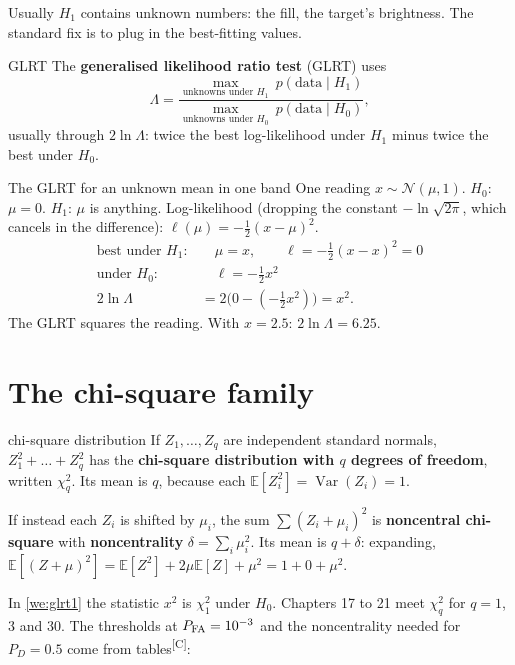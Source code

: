 \documentclass[11pt,a4paper,oneside,openany]{book}
\newcommand{\comp}{\textsuperscript{\textsf{\scriptsize[C]}}}
\newcommand{\E}{\mathbb{E}}
\newcommand{\Var}{\operatorname{Var}}
\begin{document}
Usually $H_1$ contains unknown numbers: the fill, the target's brightness. The standard fix is to plug in the best-fitting values.

\begin{defn}{GLRT}
The \textbf{generalised likelihood ratio test} (GLRT) uses
\[
  \Lambda=\frac{\max_{\text{unknowns under }H_1}\ p(\text{data}\mid H_1)}{\max_{\text{unknowns under }H_0}\ p(\text{data}\mid H_0)},
\]
usually through $2\ln\Lambda$: twice the best log-likelihood under $H_1$ minus twice the best under $H_0$.
\end{defn}

\begin{worked}[label=we:glrt1]{The GLRT for an unknown mean in one band}
One reading $x\sim\mathcal N(\mu,1)$. $H_0$: $\mu=0$. $H_1$: $\mu$ is anything. Log-likelihood (dropping the constant
$-\ln\sqrt{2\pi}$, which cancels in the difference): $\ell(\mu)=-\frac12(x-\mu)^2$.
\begin{align*}
\text{best under }H_1: &\quad \mu=x,\qquad \ell=-\tfrac12(x-x)^2=0\\
\text{under }H_0: &\quad \ell=-\tfrac12x^2\\
2\ln\Lambda &= 2\big(0-(-\tfrac12x^2)\big)=x^2 .
\end{align*}
The GLRT squares the reading. With $x=2.5$: $2\ln\Lambda=6.25$.
\end{worked}

\section{The chi-square family}

\begin{defn}{chi-square distribution}
If $Z_1,\dots,Z_q$ are independent standard normals, $Z_1^2+\dots+Z_q^2$ has the \textbf{chi-square distribution with $q$
degrees of freedom}, written $\chi^2_q$. Its mean is $q$, because each $\E[Z_i^2]=\Var(Z_i)=1$.

If instead each $Z_i$ is shifted by $\mu_i$, the sum $\sum(Z_i+\mu_i)^2$ is \textbf{noncentral chi-square} with
\textbf{noncentrality} $\delta=\sum_i\mu_i^2$. Its mean is $q+\delta$: expanding, $\E[(Z+\mu)^2]=\E[Z^2]+2\mu\E[Z]+\mu^2=1+0+\mu^2$.
\end{defn}

In \cref{we:glrt1} the statistic $x^2$ is $\chi^2_1$ under $H_0$. Chapters 17 to 21 meet $\chi^2_q$ for $q=1$, 3 and 30. The
thresholds at $P_{\rm FA}=10^{-3}$ and the noncentrality needed for $P_D=0.5$ come from tables\comp:
\end{document}
